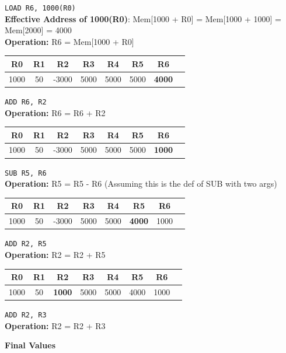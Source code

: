 \documentclass[a4paper, 15pt]{exam}
\begin{document}
\begin{enumerate}
\verb|LOAD R6, 1000(R0)| \\
\textbf{Effective Address of 1000(R0)}: Mem[1000 + R0] = Mem[1000 + 1000] = Mem[2000] = 4000\\
\textbf{Operation:} R6 = Mem[1000 + R0]

\begin{center}
 	\begin{tabular}{ |c|c|c|c|c|c|c|c|} 
 		\hline
 		R0 & R1 & R2& R3 & R4 &R5&R6\\ 
 		\hline
 		1000 & 50 & -3000 & 5000 & 5000 & 5000 & \textbf{4000}\\ 
 		\hline
 	\end{tabular}
 \end{center}

 \verb|ADD R6, R2| \\
 \textbf{Operation:} R6 = R6 + R2

\begin{center}
 	\begin{tabular}{ |c|c|c|c|c|c|c|c|} 
 		\hline
 		R0 & R1 & R2& R3 & R4 &R5&R6\\ 
 		\hline
 		1000 & 50 & -3000 & 5000 & 5000 & 5000 & \textbf{1000}\\ 
 		\hline
 	\end{tabular}
 \end{center}
 
\verb|SUB R5, R6| \\
\textbf{Operation:} R5 = R5 - R6 (Assuming this is the def of SUB with two args)

\begin{center}
 	\begin{tabular}{ |c|c|c|c|c|c|c|c|} 
 		\hline
 		R0 & R1 & R2& R3 & R4 &R5&R6\\ 
 		\hline
 		1000 & 50 & -3000 & 5000 & 5000 & \textbf{4000} & 1000\\ 
 		\hline
 	\end{tabular}
 \end{center}
 \verb|ADD R2, R5| \\
 \textbf{Operation:} R2 = R2 + R5
 
 \begin{center}
 	\begin{tabular}{ |c|c|c|c|c|c|c|c|} 
 		\hline
 		R0 & R1 & R2& R3 & R4 &R5&R6\\ 
 		\hline
 		1000 & 50 & \textbf{1000} & 5000 & 5000 & 4000 & 1000\\ 
 		\hline
 	\end{tabular}
 \end{center}
 \verb|ADD R2, R3| \\
 \textbf{Operation:} R2 = R2 + R3
 \begin{center}\textbf{Final Values}\end{center}
 

\end{enumerate}
\end{document}
